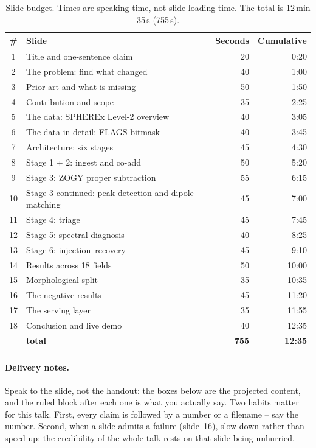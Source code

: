 \documentclass[11pt,a4paper]{article}
\begin{document}
\begin{table}[H]
\centering\small
\caption{Slide budget. Times are speaking time, not slide-loading time. The total is 12\,min
35\,s (755\,s).}
\label{tab:budget}
\begin{tabular}{@{}clrr@{}}
\toprule
\textbf{\#} & \textbf{Slide} & \textbf{Seconds} & \textbf{Cumulative} \\
\midrule
1 & Title and one-sentence claim & 20 & 0:20 \\
2 & The problem: find what changed & 40 & 1:00 \\
3 & Prior art and what is missing & 50 & 1:50 \\
4 & Contribution and scope & 35 & 2:25 \\
5 & The data: SPHEREx Level-2 overview & 40 & 3:05 \\
6 & The data in detail: FLAGS bitmask & 40 & 3:45 \\
7 & Architecture: six stages & 45 & 4:30 \\
8 & Stage 1 + 2: ingest and co-add & 50 & 5:20 \\
9 & Stage 3: ZOGY proper subtraction & 55 & 6:15 \\
10 & Stage 3 continued: peak detection and dipole matching & 45 & 7:00 \\
11 & Stage 4: triage & 45 & 7:45 \\
12 & Stage 5: spectral diagnosis & 40 & 8:25 \\
13 & Stage 6: injection--recovery & 45 & 9:10 \\
14 & Results across 18 fields & 50 & 10:00 \\
15 & Morphological split & 35 & 10:35 \\
16 & The negative results & 45 & 11:20 \\
17 & The serving layer & 35 & 11:55 \\
18 & Conclusion and live demo & 40 & 12:35 \\
\midrule
 & \textbf{total} & \textbf{755} & \textbf{12:35} \\
\bottomrule
\end{tabular}
\end{table}

\paragraph{Delivery notes.} Speak to the slide, not the handout: the boxes below are the projected
content, and the ruled block after each one is what you actually say. Two habits matter for this
talk. First, every claim is followed by a number or a filename -- say the number. Second, when a
slide admits a failure (slide~16), slow down rather than speed up: the credibility of the whole talk
rests on that slide being unhurried.
\end{document}
